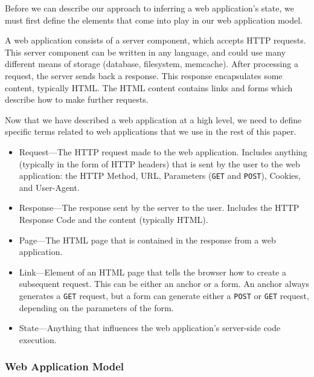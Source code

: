 Before we can describe our approach to inferring a web application's state, we
must first define the elements that come into play in our web application model.

A web application consists of a server component, which accepts HTTP requests.
This server component can be written in any language, and could use many
different means of storage (database, filesystem, memcache). After
processing a request, the server sends back a response. This response
encapsulates some content, typically HTML. The HTML content contains links and
forms which describe how to make further requests. 

Now that we have described a web application at a high level, we need to define
specific terms related to web applications that we use in the rest of this paper.

\begin{itemize}

\item Request---The HTTP request made to the web application. Includes anything
  (typically in the form of HTTP headers) that is sent by the user to the web
  application: the HTTP Method, URL, Parameters (\texttt{GET} and \texttt{POST}), Cookies, and
  User-Agent.

\item Response---The response sent by the server to the user. Includes
  the HTTP Response Code and the content (typically HTML).

\item Page---The HTML page that is contained in the response from a web
  application.

\item Link---Element of an HTML page that tells the browser how to create a
  subsequent request. This can be either an anchor or a form. An anchor always
  generates a \texttt{GET} request, but a form can generate either a
  \texttt{POST} or \texttt{GET} request, depending on the parameters of the
  form.

\item State---Anything that influences the web application's server-side code execution.

\end{itemize}

\subsubsection{Web Application Model}

